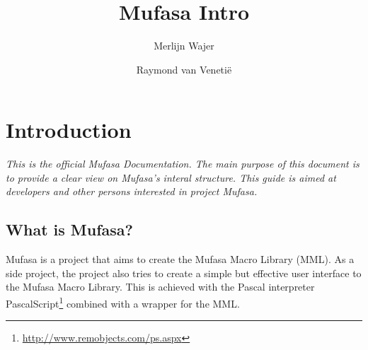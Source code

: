 \documentclass[a4paper, 10pt]{report} %
\begin{document}
\title{Mufasa Intro}
\author{Merlijn Wajer \and Raymond van Veneti\"{e}}
\maketitle
\tableofcontents

\chapter{Introduction}

\emph{This is the official Mufasa Documentation.
The main purpose of this document is to provide a clear view on Mufasa's 
interal structure. This guide is aimed at developers and other persons
interested in project Mufasa.}

\section{What is Mufasa?}

Mufasa is a project that aims to create the Mufasa Macro Library (MML).
As a side project, the project also tries to create a simple but effective
user interface to the Mufasa Macro Library. This is achieved with the
Pascal interpreter PascalScript\footnote{
\url{http://www.remobjects.com/ps.aspx}} combined with a wrapper for the MML.
\end{document}
